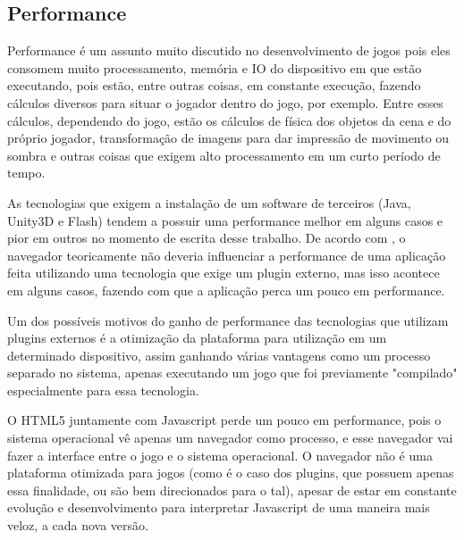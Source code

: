 \subsection{Performance}

Performance é um assunto muito discutido no desenvolvimento de jogos
pois eles consomem muito processamento, memória e IO do dispositivo em que estão
executando, pois estão, entre outras coisas, em constante execução, fazendo
cálculos diversos para situar o jogador dentro do jogo, por exemplo.
Entre esses cálculos, dependendo do jogo, estão os cálculos de física dos
objetos da cena e do próprio jogador, transformação de imagens para
dar impressão de movimento ou sombra e outras coisas que exigem alto
processamento em um curto período de tempo.

As tecnologias que exigem a instalação de um software de terceiros
(Java, Unity3D e Flash) tendem a possuir uma performance melhor em alguns casos
e pior em outros no momento de escrita desse trabalho. De acordo com ,
o navegador teoricamente não deveria influenciar a performance de uma aplicação
feita utilizando uma tecnologia que exige um plugin externo, mas isso acontece
em alguns casos, fazendo com que a aplicação perca um pouco em performance.

Um dos possíveis motivos do ganho de performance das tecnologias que
utilizam plugins externos é a otimização da plataforma para utilização em um determinado
dispositivo, assim ganhando várias vantagens como um processo separado no
sistema, apenas executando um jogo que foi previamente "compilado"
especialmente para essa tecnologia.

O HTML5 juntamente com Javascript perde um pouco em performance, pois
o sistema operacional vê apenas um navegador como processo, e esse
navegador vai fazer a interface entre o jogo e o sistema operacional.
O navegador não é uma plataforma otimizada para jogos (como é o caso
dos plugins, que possuem apenas essa finalidade, ou são bem
direcionados para o tal), apesar de estar em constante evolução e
desenvolvimento para interpretar Javascript de uma maneira mais veloz,
a cada nova versão.


